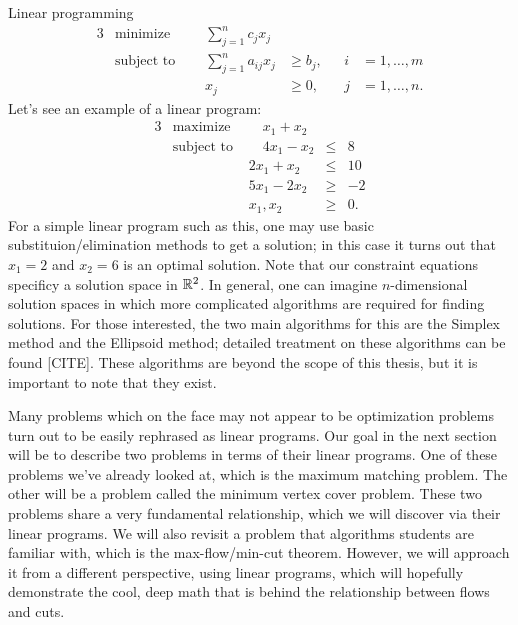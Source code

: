 \begin{section}{Linear programming}
	\begin{alignat}{3}
		& \text{minimize } & \sum_{j=1}^{n} c_{j} x_{j}& \\
		& \text{subject to } \quad & \sum_{j=1}^{n} a_{ij} x_{j} & \geq b_{j}, & i & = 1, \dots 
		, m \\
				&& x_{j} & \geq 0, \quad & j & = 1, \dots, n.
	\end{alignat}
	Let's see an example of a linear program:
	\begin{alignat*}{3}
		& \text{maximize } &\quad x_1 + x_2 & \\
		& \text{subject to } &\quad 4x_1 - x_2 &\leq &8 \\
				     && 2x_1 + x_2 &\leq &10 \\
				     && 5x_1 - 2x_2 &\geq &-2 \\
				     && x_1,x_2 & \geq &0.
	\end{alignat*}
	For a simple linear program such as this, one may use basic substituion/elimination methods 
	to get a solution; in this case it turns out that $x_1 = 2$ and $x_2 = 6$ is an optimal 
	solution. Note that our 
	constraint equations specificy a solution space in $\mathbb{R}^2$. In general, one can imagine 
	$n$-dimensional solution spaces in which more complicated algorithms are required for 
	finding solutions. For those interested, the two main algorithms for this are the Simplex 
	method and the Ellipsoid method; detailed treatment on these algorithms can be found 
	[CITE]. These algorithms are beyond the scope of this thesis, but it is important to note that 
	they exist.
\end{section}

	Many problems which on the face may not appear to be optimization problems turn out to be 
	easily rephrased as linear programs. Our goal in the next section will be to describe two 
	problems in terms of their linear programs. One of these problems we've already looked at, 
	which is the maximum matching problem. The other will be a problem called the minimum vertex 
	cover problem. These two problems share a very fundamental relationship, which we will discover 
	via their linear programs. We will also revisit a problem that algorithms students are familiar
	with, which is the max-flow/min-cut theorem. However, we will approach it from a different 
	perspective, using linear programs, which will hopefully demonstrate the cool, deep math 
	that is behind the relationship between flows and cuts.
